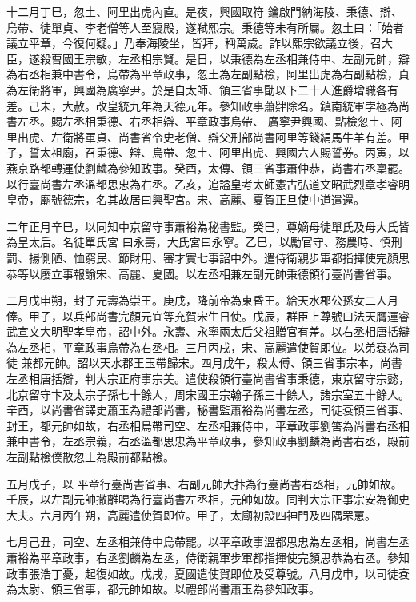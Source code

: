 \begin{pinyinscope}
 十二月丁巳，忽土、阿里出虎內直。是夜，興國取符
 鑰啟門納海陵、秉德、辯、烏帶、徒單貞、李老僧等人至寢殿，遂弒熙宗。秉德等未有所屬。忽土曰：「始者議立平章，今復何疑。」乃奉海陵坐，皆拜，稱萬歲。詐以熙宗欲議立後，召大臣，遂殺曹國王宗敏，左丞相宗賢。是日，以秉德為左丞相兼侍中、左副元帥，辯為右丞相兼中書令，烏帶為平章政事，忽土為左副點檢，阿里出虎為右副點檢，貞為左衛將軍，興國為廣寧尹。於是自太師、領三省事勖以下二十人進爵增職各有差。己未，大赦。改皇統九年為天德元年。參知政事蕭肄除名。鎮南統軍孛極為尚書左丞。賜左丞相秉德、右丞相辯、平章政事烏帶、
 廣寧尹興國、點檢忽土、阿里出虎、左衛將軍貞、尚書省令史老僧、辯父刑部尚書阿里等錢絹馬牛羊有差。甲子，誓太祖廟，召秉德、辯、烏帶、忽土、阿里出虎、興國六人賜誓券。丙寅，以燕京路都轉運使劉麟為參知政事。癸酉，太傳、領三省事蕭仲恭，尚書右丞稟罷。以行臺尚書左丞溫都思忠為右丞。乙亥，追謚皇考太師憲古弘道文昭武烈章孝睿明皇帝，廟號德宗，名其故居曰興聖宮。宋、高麗、夏賀正旦使中道遣還。



 二年正月辛巳，以同知中京留守事蕭裕為秘書監。癸巳，尊嫡母徒單氏及母大氏皆為皇太后。名徒單氏宮
 曰永壽，大氏宮曰永寧。乙巳，以勵官守、務農時、慎刑罰、揚側陋、恤窮民、節財用、審才實七事詔中外。遣侍衛親步軍都指揮使完顏思恭等以廢立事報諭宋、高麗、夏國。以左丞相兼左副元帥秉德領行臺尚書省事。



 二月戊申朔，封子元壽為崇王。庚戌，降前帝為東昏王。給天水郡公孫女二人月俸。甲子，以兵部尚書完顏元宜等充賀宋生日使。戊辰，群臣上尊號曰法天膺運睿武宣文大明聖孝皇帝，詔中外。永壽、永寧兩太后父祖贈官有差。以右丞相唐括辯為左丞相，平章政事烏帶為右丞相。三月丙戌，宋、高麗遣使賀即位。以弟袞為司徒
 兼都元帥。詔以天水郡王玉帶歸宋。四月戊午，殺太傅、領三省事宗本，尚書左丞相唐括辯，判大宗正府事宗美。遣使殺領行臺尚書省事秉德，東京留守宗懿，北京留守卞及太宗子孫七十餘人，周宋國王宗翰子孫三十餘人，諸宗室五十餘人。辛酉，以尚書省譯史蕭玉為禮部尚書，秘書監蕭裕為尚書左丞，司徒袞領三省事、封王，都元帥如故，右丞相烏帶司空、左丞相兼侍中，平章政事劉筈為尚書右丞相兼中書令，左丞宗義，右丞溫都思忠為平章政事，參知政事劉麟為尚書右丞，殿前左副點檢僕散忽土為殿前都點檢。



 五月戊子，以
 平章行臺尚書省事、右副元帥大抃為行臺尚書右丞相，元帥如故。壬辰，以左副元帥撒離喝為行臺尚書左丞相，元帥如故。同判大宗正事宗安為御史大夫。六月丙午朔，高麗遣使賀即位。甲子，太廟初設四神門及四隅罘罳。



 七月己丑，司空、左丞相兼侍中烏帶罷。以平章政事溫都思忠為左丞相，尚書左丞蕭裕為平章政事，右丞劉麟為左丞，侍衛親軍步軍都指揮使完顏思恭為右丞。參知政事張浩丁憂，起復如故。戊戌，夏國遣使賀即位及受尊號。八月戊申，以司徒袞為太尉、領三省事，都元帥如故。以禮部尚書蕭玉為參知政事。




\end{pinyinscope}
